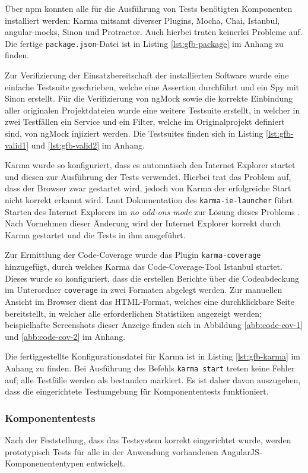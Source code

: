 Über npm konnten alle für die Ausführung von Tests benötigten Komponenten installiert werden: Karma mitsamt diverser Plugins, Mocha, Chai, Istanbul, angular-mocks, Sinon und Protractor. Auch hierbei traten keinerlei Probleme auf. Die fertige \texttt{package.json}-Datei ist in Listing \ref{lst:gfb-package} im Anhang zu finden.

Zur Verifizierung der Einsatzbereitschaft der installierten Software wurde eine einfache Testsuite geschrieben, welche eine Assertion durchführt und ein Spy mit Sinon erstellt. Für die Verifizierung von ngMock sowie die korrekte Einbindung aller originalen Projektdateien wurde eine weitere Testsuite erstellt, in welcher in zwei Testfällen ein Service und ein Filter, welche im Originalprojekt definiert sind, von ngMock injiziert werden. Die Testsuites finden sich in Listing \ref{lst:gfb-valid1} und \ref{lst:gfb-valid2} im Anhang. 

Karma wurde so konfiguriert, dass es automatisch den Internet Explorer startet und diesen zur Ausführung der Tests verwendet. Hierbei trat das Problem auf, dass der Browser zwar gestartet wird, jedoch von Karma der erfolgreiche Start nicht korrekt erkannt wird. Laut Dokumentation des \texttt{karma-ie-launcher} führt Starten des Internet Explorers im \textit{no add-ons mode} zur Lösung dieses Problems \cite{karma-ie-launcher}. Nach Vornehmen dieser Änderung wird der Internet Explorer korrekt durch Karma gestartet und die Tests in ihm ausgeführt.

Zur Ermittlung der Code-Coverage wurde das Plugin \texttt{karma-coverage} hinzugefügt, durch welches Karma das Code-Coverage-Tool Istanbul startet. Dieses wurde so konfiguriert, dass die erstellen Berichte über die Codeabdeckung im Unterordner \texttt{coverage} in zwei Formaten abgelegt werden. Zur manuellen Ansicht im Browser dient das HTML-Format, welches eine durchklickbare Seite bereitstellt, in welcher alle erforderlichen Statistiken angezeigt werden; beispielhafte Screenshots dieser Anzeige finden sich in Abbildung \ref{abb:code-cov-1} und \ref{abb:code-cov-2} im Anhang. 

Die fertiggestellte Konfigurationsdatei für Karma ist in Listing \ref{lst:gfb-karma} im Anhang zu finden. Bei Ausführung des Befehls \texttt{karma start} treten keine Fehler auf; alle Testfälle werden als bestanden markiert. Es ist daher davon auszugehen, dass die eingerichtete Testumgebung für Komponententests funktioniert. 	

\subsubsection{Komponententests}
Nach der Feststellung, dass das Testsystem korrekt eingerichtet wurde, werden prototypisch Tests für alle in der Anwendung vorhandenen AngularJS-Komponenententypen entwickelt.

